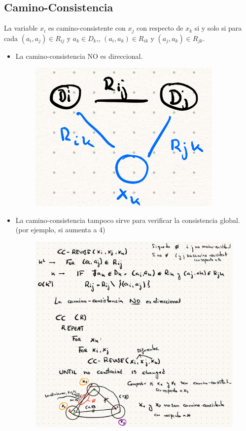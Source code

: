 \documentclass[12pt, twoside, openright]{report} %
\begin{document}
	
\subsection{Camino-Consistencia}


    La variable \(x_i\) es camino-consistente con \(x_j\) con respecto
    de \(x_k\) si y solo si para cada \((a_i,a_j) \in R_{ij}\) y
    \(a_k \in D_k\),, \((a_i,a_k) \in R_{ik}\) y
    \((a_j,a_k) \in R_{jk}\).

    \begin{itemize}
    \item
      La camino-consistencia NO es direccional.
	  \begin{figure}[H]
		{\includegraphics[scale=.42]{Untitled 40.png}}
	\end{figure}
	\pagebreak
    \item
      La camino-consistencia tampoco sirve para verificar la
      consistencia global. (por ejemplo, si aumenta a 4)
	  \begin{figure}[H]
		{\includegraphics[scale=.15]{Untitled 41.png}}
	\end{figure}
    \end{itemize}
\end{document}
